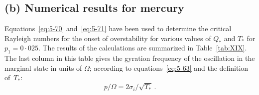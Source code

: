 \subsection*{(b) Numerical results for mercury}

Equations~\eqref{eq:5-70} and~\eqref{eq:5-71} have been used to determine the critical
Rayleigh numbers for the onset of overstability for various values of
$Q_*$ and $T_*$ for $p_1 = 0{\cdot}025$. The results of the calculations are summarized
in Table~\ref{tab:XIX}. The last column in this table gives the gyration frequency
of the oscillation in the marginal state in units of $\Omega$; according to equations~\eqref{eq:5-63} and the definition of~$T_*$:
\begin{equation}
p/\Omega = 2\sigma_i/\!\sqrt{T_*}\,.
\label{eq:5-72}
\end{equation}

